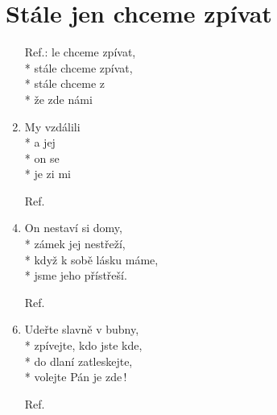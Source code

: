 \section{Stále jen chceme zpívat}
\begin{enumerate}
\item[Ref.:]	le  chceme zpívat, \\*
	stále  chceme zpívat, \\*
	stále  chceme z\\*
	že  zde  námi 
\item	My  vzdálili  \\*
	a  jej \\*
	on   se  \\*
	je zi mi  
\item[Ref.]

\item	On nestaví si domy,\\*
	zámek jej nestřeží,\\*
	když k sobě lásku máme,\\*
	jsme jeho přístřeší. 
\item[Ref.]

\item	Udeřte slavně v bubny,\\*
	zpívejte, kdo jste kde,\\*
	do dlaní zatleskejte,\\*
	volejte Pán je zde\,! 
\item[Ref.] 
\end{enumerate}
